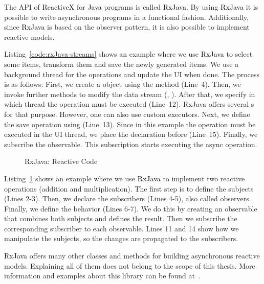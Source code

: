\documentclass[type=bsc,accentcolor=tud9c]{tudthesis}
\newcommand{\framework}[1]{\textcolor{black}{#1}}
\begin{document}
The API of \framework{ReactiveX} for \framework{Java} programs is called \framework{RxJava}. By using \framework{RxJava} it is possible to write asynchronous programs in a functional fashion. Additionally, since \framework{RxJava} is based on the observer pattern, it is also possible to implement reactive models.

Listing~\ref{code:rxJava-streams} shows an example where we use \framework{RxJava} to select some items, transform them and save the newly generated items. We use a background thread for the operations and update the UI when done. The process is as follows: First, we create a  object using the method  (Line~4). Then, we invoke further methods to modify the data stream (, ). After that, we specify in which thread the operation must be executed (Line~12). RxJava offers several s for that purpose. However, one can also use custom executors. Next, we define the save operation using  (Line~13). Since in this example the  operation must be executed in the UI thread, we place the  declaration before  (Line~15). Finally, we subscribe the observable. This subscription starts executing the async operation.

\begin{figure}[t]
\begin{sourcecode}

\caption{RxJava: Reactive Code}
\label{code:rxJava-reactive-code}
\end{sourcecode}
\end{figure}

Listing~\ref{code:rxJava-reactive-code} shows an example where we use \framework{RxJava} to implement two reactive operations (addition and multiplication). The first step is to define the subjects (Lines 2-3). Then, we declare the subscribers (Lines 4-5), also called observers. Finally, we define the behavior (Lines 6-7). We do this by creating an observable that combines both subjects and defines the result. Then we subscribe the corresponding subscriber to each observable. Lines 11 and 14 show how we manipulate the subjects, so the changes are propagated to the subscribers.

\framework{RxJava} offers many other classes and methods for building asynchronous reactive models. Explaining all of them does not belong to the scope of this thesis. More information and examples about this library can be found at~\cite{bookLearningReactive}.
\end{document}
